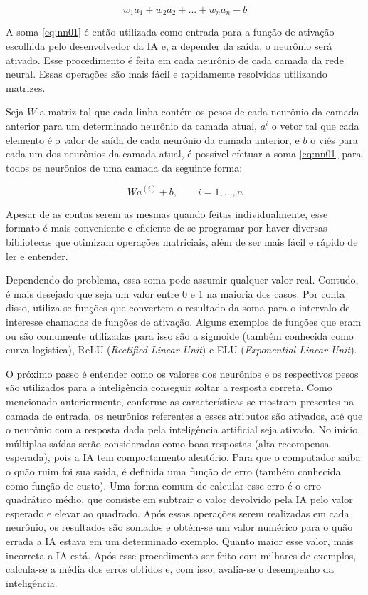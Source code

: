 \begin{equation} \label{eq:nn01}
w_{1}a_{1} + w_{2}a_{2} + ... + w_{n}a_{n} - b
\end{equation}

A soma \ref{eq:nn01} é então utilizada como entrada para a função de ativação escolhida pelo desenvolvedor da IA e, a depender da saída, o neurônio será ativado. Esse procedimento é feita em cada neurônio de cada camada da rede neural.
Essas operações são mais fácil e rapidamente resolvidas utilizando matrizes.

Seja $W$ a matriz tal que cada linha contém os pesos de cada neurônio da camada anterior para um determinado neurônio da camada atual, $a^{i}$ o vetor tal que cada elemento é o valor de saída de cada neurônio da camada anterior, e $b$ o viés para cada um dos neurônios da camada atual, é possível efetuar a soma \ref{eq:nn01} para todos os neurônios de uma camada da seguinte forma:

\begin{equation} \label{eq:nn01}
Wa^{(i)} + b, \qquad i = 1, ..., n
\end{equation}

Apesar de as contas serem as mesmas quando feitas individualmente, esse formato é mais conveniente e eficiente de se programar por haver diversas bibliotecas que otimizam operações matriciais, além de ser mais fácil e rápido de ler e entender.

Dependendo do problema, essa soma pode assumir qualquer valor real. Contudo, é mais desejado que seja um valor entre 0 e 1 na maioria dos casos. Por conta disso, utiliza-se funções que convertem o resultado da soma para o intervalo de interesse chamadas de funções de ativação. Alguns exemplos de funções que eram ou são comumente utilizadas para isso são a sigmoide (também conhecida como curva logistica), ReLU (\textit{Rectified Linear Unit}) e ELU (\textit{Exponential Linear Unit}).

O próximo passo é entender como os valores dos neurônios e os respectivos pesos são utilizados para a inteligência conseguir soltar a resposta correta.
Como mencionado anteriormente, conforme as características se mostram presentes na camada de entrada, os neurônios referentes a esses atributos são ativados, até que o neurônio com a resposta dada pela inteligência artificial seja ativado.
No início, múltiplas saídas serão consideradas como boas respostas (alta recompensa esperada), pois a IA tem comportamento aleatório.
Para que o computador saiba o quão ruim foi sua saída, é definida uma função de erro (também conhecida como função de custo). Uma forma comum de calcular esse erro é o erro quadrático médio, que consiste em subtrair o valor devolvido pela IA pelo valor esperado e elevar ao quadrado. Após essas operações serem realizadas em cada neurônio, os resultados são somados e obtém-se um valor numérico para o quão errada a IA estava em um determinado exemplo. Quanto maior esse valor, mais incorreta a IA está. Após esse procedimento ser feito com milhares de exemplos, calcula-se a média dos erros obtidos e, com isso, avalia-se o desempenho da inteligência.

